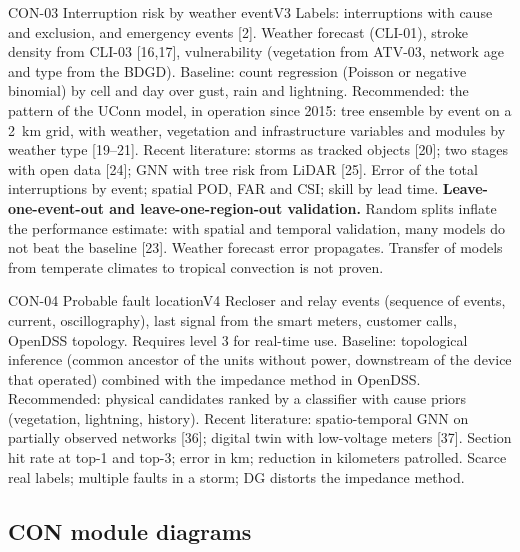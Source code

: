 \begin{ficha}{CON-03 \textperiodcentered{} Interruption risk by weather event}{V3}
 Labels: interruptions with cause and exclusion, and emergency
events [2]. Weather forecast (CLI-01), stroke density from
CLI-03 [16,17], vulnerability (vegetation from ATV-03, network age and type from
the BDGD).
 Baseline: count regression (Poisson or negative
binomial) by cell and day over gust, rain and lightning. Recommended: the
pattern of the UConn model, in operation since 2015: tree ensemble by
event on a 2~km grid, with weather, vegetation and
infrastructure variables and modules by weather type [19--21]. Recent literature:
storms as tracked objects [20]; two stages with open data
[24]; GNN with tree risk from LiDAR [25].
 Error of the total interruptions by event; spatial POD, FAR
and CSI; skill by lead time. \textbf{Leave-one-event-out and
leave-one-region-out validation.}
 Random splits inflate the performance estimate: with spatial
and temporal validation, many models do not beat the baseline [23]. Weather
forecast error propagates. Transfer of models from temperate climates
to tropical convection is not proven.
\end{ficha}

\begin{ficha}{CON-04 \textperiodcentered{} Probable fault location}{V4}
 Recloser and relay events (sequence of events, current,
oscillography), last signal from the smart meters, customer calls,
OpenDSS topology. Requires level 3 for real-time use.
 Baseline: topological inference (common ancestor of the
units without power, downstream of the device that operated) combined with the
impedance method in OpenDSS. Recommended: physical candidates ranked
by a classifier with cause priors (vegetation, lightning, history).
Recent literature: spatio-temporal GNN on partially observed networks [36];
digital twin with low-voltage meters [37].
 Section hit rate at top-1 and top-3; error in km; reduction in
kilometers patrolled.
 Scarce real labels; multiple faults in a storm; DG
distorts the impedance method.
\end{ficha}

\subsection*{CON module diagrams}


